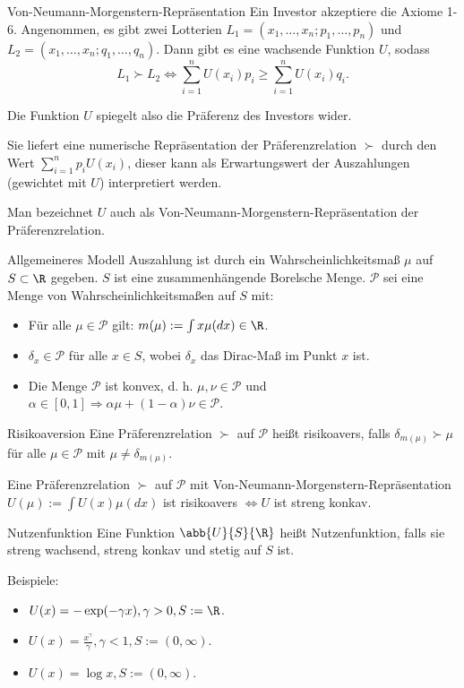\begin{karte}{Von-Neumann-Morgenstern-Repräsentation}
Ein Investor akzeptiere die Axiome 1-6. Angenommen, es gibt zwei Lotterien 
\(L_1 = (x_1, \ldots, x_n; p_1, \ldots, p_n)\) und \(L_2 = (x_1, \ldots, x_n; q_1, \ldots, q_n)\). 
Dann gibt es eine wachsende Funktion \(U\), sodass 
\[ L_1 \succ L_2 \Leftrightarrow \sum_{i=1}^n U(x_i) p_i \geq \sum_{i=1}^n U(x_i) q_i. \]

Die Funktion \(U\) spiegelt also die Präferenz des Investors wider. 

Sie liefert eine numerische Repräsentation der Präferenzrelation \(\succ\) 
durch den Wert \(\sum_{i=1}^n p_i U(x_i)\), dieser kann als Erwartungswert der Auszahlungen 
(gewichtet mit \(U\)) interpretiert werden. 

Man bezeichnet \(U\) auch als 
Von-Neumann-Morgenstern-Repräsentation der Präferenzrelation.
\end{karte}

\begin{karte}{Allgemeineres Modell}
Auszahlung ist durch ein Wahrscheinlichkeitsmaß \(\mu\) auf \(S\subset \R\) gegeben. 
\(S\) ist eine zusammenhängende Borelsche Menge. \(\mathcal{P}\) sei eine Menge von Wahrscheinlichkeitsmaßen 
auf \(S\) mit: 
\begin{itemize}
    \item Für alle \(\mu \in \mathcal{P}\) gilt: \(m(\mu) := \int x \mu(dx) \in \R\). 
    \item \(\delta_x \in \mathcal{P}\) für alle \(x\in S\), wobei \(\delta_x\) 
    das Dirac-Maß im Punkt \(x\) ist. 
    \item Die Menge \(\mathcal{P}\) ist konvex, d. h. \(\mu,\nu \in \mathcal{P}\) und 
    \(\alpha \in [0,1] \Rightarrow \alpha\mu + (1-\alpha) \nu \in \mathcal{P}\).
\end{itemize}
\end{karte}

\begin{karte}{Risikoaversion}
Eine Präferenzrelation \(\succ\) auf \(\mathcal{P}\) heißt risikoavers, falls 
\(\delta_{m(\mu)} \succ \mu\) für alle \(\mu \in \mathcal{P}\) mit 
\(\mu \neq \delta_{m(\mu)}\).

Eine Präferenzrelation \(\succ\) auf \(\mathcal{P}\) mit Von-Neumann-Morgenstern-Repräsentation 
\(U(\mu) := \int U(x) \mu(dx)\) ist risikoavers \(\Leftrightarrow U\) ist streng konkav.
\end{karte}

\begin{karte}{Nutzenfunktion}
Eine Funktion \(\abb{U}{S}{\R}\) heißt Nutzenfunktion, falls sie streng wachsend, 
streng konkav und stetig auf \(S\) ist.

Beispiele: 
\begin{itemize}
    \item \(U(x) = -\exp(-\gamma x), \gamma > 0, S := \R\).
    \item \(U(x) = \frac{x^\gamma}{\gamma}, \gamma < 1, S := (0,\infty)\).
    \item \(U(x) = \log x, S := (0,\infty)\).
\end{itemize}
\end{karte}

